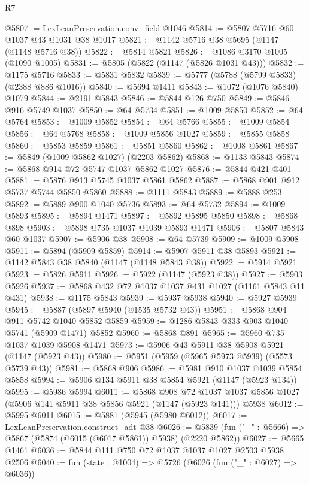 \begin{lexlean}{R7}
\begin{coremodule}
@5807 := LexLeanPreservation.conv_field @1046
@5814 := @5807 @5716 @60 @1037 @43 @1031 @38 @1017
@5821 := @1142 @5716 @38 @5695 (@1147 (@1148 @5716 @38))
@5822 := @5814 @5821
@5826 := @1086 @3170 @1005 (@1090 @1005)
@5831 := @5805 (@5822 (@1147 (@5826 @1031 @43)))
@5832 := @1175 @5716
@5833 := @5831 @5832
@5839 := @5777 (@5788 (@5799 @5833) (@2388 @886 @1016))
@5840 := @5694 @1411
@5843 := @1072 (@1076 @5840) @1079
@5844 := @2191 @5843
@5846 := @5844 @126 @750
@5849 := @5846 @916 @5749 @1037
@5850 := @64 @5734
@5851 := @1009 @5850
@5852 := @64 @5764
@5853 := @1009 @5852
@5854 := @64 @5766
@5855 := @1009 @5854
@5856 := @64 @5768
@5858 := @1009 @5856 @1027
@5859 := @5855 @5858
@5860 := @5853 @5859
@5861 := @5851 @5860
@5862 := @1008 @5861
@5867 := @5849 (@1009 @5862 @1027) (@2203 @5862)
@5868 := @1133 @5843
@5874 := @5868 @914 @72 @5747 @1037 @5862 @1027
@5876 := @5844 @421 @401
@5881 := @5876 @913 @5745 @1037 @5861 @5862
@5887 := @5868 @901 @912 @5737 @5744 @5850 @5860
@5888 := @1111 @5843
@5889 := @5888 @253
@5892 := @5889 @900 @1040 @5736
@5893 := @64 @5732
@5894 := @1009 @5893
@5895 := @5894 @1471
@5897 := @5892 @5895 @5850
@5898 := @5868 @898
@5903 := @5898 @735 @1037 @1039 @5893 @1471
@5906 := @5807 @5843 @60 @1037
@5907 := @5906 @38
@5908 := @64 @5739
@5909 := @1009 @5908
@5911 := @5894 (@5909 @5859)
@5914 := @5907 @5911 @38 @5893
@5921 := @1142 @5843 @38 @5840 (@1147 (@1148 @5843 @38))
@5922 := @5914 @5921
@5923 := @5826 @5911
@5926 := @5922 (@1147 (@5923 @38))
@5927 := @5903 @5926
@5937 := @5868 @432 @72 @1037 @1037 @431 @1027 (@1161 @5843 @11 @431)
@5938 := @1175 @5843
@5939 := @5937 @5938
@5940 := @5927 @5939
@5945 := @5887 (@5897 @5940 (@1535 @5732 @43))
@5951 := @5868 @904 @911 @5742 @1040 @5852 @5859
@5959 := @1286 @5843 @333 @903 @1040 @5741 (@5909 @1471) @5852
@5960 := @5868 @891
@5965 := @5960 @735 @1037 @1039 @5908 @1471
@5973 := @5906 @43 @5911 @38 @5908 @5921 (@1147 (@5923 @43))
@5980 := @5951 (@5959 (@5965 @5973 @5939) (@5573 @5739 @43))
@5981 := @5868 @906
@5986 := @5981 @910 @1037 @1039 @5854 @5858
@5994 := @5906 @134 @5911 @38 @5854 @5921 (@1147 (@5923 @134))
@5995 := @5986 @5994
@6011 := @5868
    @908
    @72
    @1037
    @1037
    @5856
    @1027
    (@5906 @141 @5911 @38 @5856 @5921 (@1147 (@5923 @141)))
    @5938
@6012 := @5995 @6011
@6015 := @5881 (@5945 (@5980 @6012))
@6017 := LexLeanPreservation.construct_adt @38
@6026 := @5839 (fun ("_" : @5666) => @5867 (@5874 (@6015 (@6017 @5861)) @5938) (@2220 @5862))
@6027 := @5665 @1461
@6036 := @5844 @111 @750 @72 @1037 @1037 @1027 @2503 @5938 @2506
@6040 := fun (state : @1004) => @5726 (@6026 (fun ("_" : @6027) => @6036))

\end{coremodule}
\end{lexlean}
